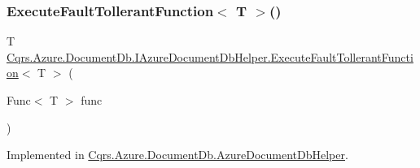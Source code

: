\mbox{\label{interfaceCqrs_1_1Azure_1_1DocumentDb_1_1IAzureDocumentDbHelper_a9693547c39af965e6eeeccc65cdd7bea_a9693547c39af965e6eeeccc65cdd7bea}} 
\subsubsection{\texorpdfstring{Execute\+Fault\+Tollerant\+Function$<$ T $>$()}{ExecuteFaultTollerantFunction< T >()}}
{\footnotesize\ttfamily T \hyperlink{interfaceCqrs_1_1Azure_1_1DocumentDb_1_1IAzureDocumentDbHelper_af0a2c96f00154420faa7c528d5bf55bb_af0a2c96f00154420faa7c528d5bf55bb}{Cqrs.\+Azure.\+Document\+Db.\+I\+Azure\+Document\+Db\+Helper.\+Execute\+Fault\+Tollerant\+Function}$<$ T $>$ (\begin{DoxyParamCaption}\item[{Func$<$ T $>$}]{func }\end{DoxyParamCaption})}



Implemented in \hyperlink{classCqrs_1_1Azure_1_1DocumentDb_1_1AzureDocumentDbHelper_a470fcc86befa4a28725ad53e715a223c_a470fcc86befa4a28725ad53e715a223c}{Cqrs.\+Azure.\+Document\+Db.\+Azure\+Document\+Db\+Helper}.

